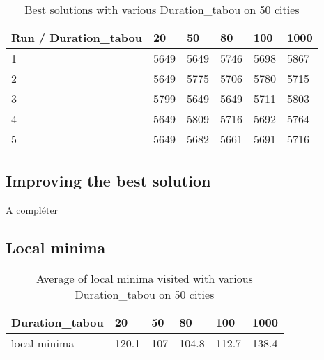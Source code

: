 \documentclass[12pt,oneside,a4paper]{article}
\begin{document}
  \begin{table}[h]
    \centering
    \small
    \begin{tabular}{llllll}
      \hline
      \multicolumn{1}{|l|}{\textbf{Run / Duration\_tabou}}& \multicolumn{1}{l|}{\textbf{20}} & \multicolumn{1}{l|}{\textbf{50}} & \multicolumn{1}{l|}{\textbf{80}} & \multicolumn{1}{l|}{\textbf{100}} & \multicolumn{1}{l|}{\textbf{1000}}\\ \hline
      \multicolumn{1}{|l|}{1} & \multicolumn{1}{l|}{5649}  & \multicolumn{1}{l|}{5649}  & \multicolumn{1}{l|}{5746}   & \multicolumn{1}{l|}{5698}  & \multicolumn{1}{l|}{5867} \\ \hline
      \multicolumn{1}{|l|}{2} & \multicolumn{1}{l|}{5649}  & \multicolumn{1}{l|}{5775}  & \multicolumn{1}{l|}{5706}  & \multicolumn{1}{l|}{5780}  & \multicolumn{1}{l|}{5715} \\ \hline         
      \multicolumn{1}{|l|}{3} & \multicolumn{1}{l|}{5799}  & \multicolumn{1}{l|}{5649}  & \multicolumn{1}{l|}{5649}  & \multicolumn{1}{l|}{5711}  & \multicolumn{1}{l|}{5803} \\ \hline
      \multicolumn{1}{|l|}{4} & \multicolumn{1}{l|}{5649}  & \multicolumn{1}{l|}{5809}  & \multicolumn{1}{l|}{5716}   & \multicolumn{1}{l|}{5692}  & \multicolumn{1}{l|}{5764}\\ \hline
      \multicolumn{1}{|l|}{5} & \multicolumn{1}{l|}{5649}  & \multicolumn{1}{l|}{5682}  & \multicolumn{1}{l|}{5661}   & \multicolumn{1}{l|}{5691}  & \multicolumn{1}{l|}{5716}\\ \hline
    \end{tabular}
    \caption{Best solutions with various Duration\_tabou on 50 cities}
  \end{table}

\subsection{Improving the best solution}
  A compléter
\subsection{Local minima}
\begin{table}[h]
    \centering
    \small
    \begin{tabular}{llllll}
      \hline
      \multicolumn{1}{|l|}{\textbf{Duration\_tabou}}& \multicolumn{1}{l|}{\textbf{20}} & \multicolumn{1}{l|}{\textbf{50}} & \multicolumn{1}{l|}{\textbf{80}} & \multicolumn{1}{l|}{\textbf{100}} & \multicolumn{1}{l|}{\textbf{1000}}\\ \hline
      \multicolumn{1}{|l|}{local minima } & \multicolumn{1}{l|}{120.1}  & \multicolumn{1}{l|}{107}  & \multicolumn{1}{l|}{104.8}   & \multicolumn{1}{l|}{112.7}  & \multicolumn{1}{l|}{138.4} \\ \hline
    \end{tabular}
    \caption{Average of local minima visited with various Duration\_tabou on 50 cities}
  \end{table}
\end{document}
